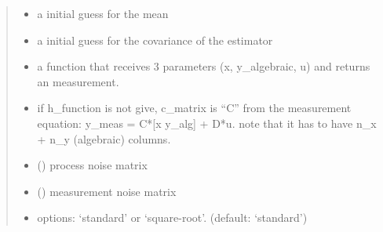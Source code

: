 \documentclass[letterpaper,10pt,english]{sphinxmanual}
\begin{document}
\begin{fulllineitems}
\begin{fulllineitems}
\begin{quote}
\begin{description}
\begin{itemize}
\item {} 
 \textendash{} a initial guess for the mean

\item {} 
 \textendash{} a initial guess for the covariance of the estimator

\item {} 
 \textendash{} a function that receives 3 parameters (x, y\_algebraic, u) and returns an measurement.

\item {} 
 \textendash{} if h\_function is not give, c\_matrix is “C” from the measurement equation:
y\_meas = C*{[}x y\_alg{]} + D*u. note that it has to have n\_x + n\_y (algebraic) columns.

\item {} 
 () \textendash{} process noise matrix

\item {} 
 () \textendash{} measurement noise matrix

\item {} 
 \textendash{} options: ‘standard’ or ‘square-root’. (default: ‘standard’)

\end{itemize}

\end{description}\end{quote}

\end{fulllineitems}


\begin{fulllineitems}
\label{\detokenize{yaocptool.estimation:yaocptool.estimation.unscented_kalman_filter.UnscentedKalmanFilter.cholupdate}}
\end{fulllineitems}



\end{fulllineitems}
\end{document}
